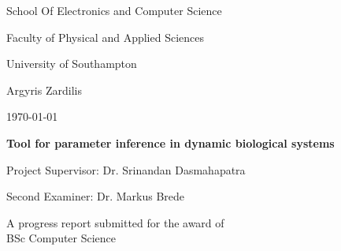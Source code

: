 \begin{titlepage}
    \let\footnotesize\small
    \let\footnoterule\relax
    \let \footnote \thanks
    \setcounter{footnote}{0}
    \begin{center}
      \setlength{\parskip}{0pt}
       {\large School Of Electronics and Computer Science \par}
      {\large Faculty of Physical and Applied Sciences \par}
      {\large University of Southampton \par}
      \vspace{29mm}
      {\large Argyris Zardilis \par}	
	\vspace{4mm}
      \large \today
	\vspace{13mm}
        \center
        {\Large \bf Tool for parameter inference in dynamic biological systems \par}
        \vspace{60mm}
      {\large Project Supervisor: Dr. Srinandan Dasmahapatra \par }
      {\large Second Examiner: Dr. Markus Brede \par}
      \vspace{12mm}
        {\large A progress report submitted for the award of }\\
      {\large BSc Computer Science }
    \end{center}
    \vfil\null
  \end{titlepage}